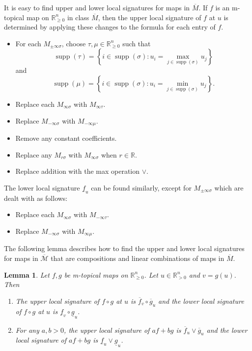 \documentclass[10pt,reqno]{amsart}
\newcommand{\R}{\mathbb{R}}
\newcommand{\supp}{\operatorname{supp}}
\theoremstyle{plain}
\newtheorem{lemma}[theorem]{Lemma}
\theoremstyle{definition}
\numberwithin{equation}{section}
\begin{document}
It is easy to find upper and lower local signatures for maps in $\overline{M}$. If $f$ is an m-topical map on $\R^n_{\ge 0}$ in class $\overline{M}$, then the upper local signature of $f$ at $u$ is determined by applying these changes to the formula for each entry of $f$. 
\begin{itemize}
\item For each $M_{\pm \infty \sigma}$, choose $\tau, \mu \in \R^n_{\ge 0}$ such that 
$$\supp(\tau) = \left\{i \in \supp(\sigma) : u_i = \max_{j \in \supp(\sigma)} u_j \right\}$$
and
$$\supp(\mu) = \left\{i \in \supp(\sigma) : u_i = \min_{j \in \supp(\sigma)} u_j \right\}.$$
\item Replace each $M_{\infty \sigma}$ with $M_{\infty \tau}$.
\item Replace $M_{-\infty \sigma}$ with $M_{-\infty \mu}$. %
\item Remove any constant coefficients.  
\item Replace any $M_{r\sigma}$ with $M_{\infty \sigma}$ when $r \in \R$.  
\item Replace addition with the max operation $\vee$.  
\end{itemize}
The lower local signature $\underline{f}_u$ can be found similarly, except for $M_{\pm \infty \sigma}$ which are dealt with as follows:
\begin{itemize}
\item Replace each $M_{\infty \sigma}$ with $M_{-\infty \tau}$.  
\item Replace $M_{-\infty \sigma}$ with $M_{\infty \mu}$.
\end{itemize}

The following lemma describes how to find the upper and lower local signatures for maps in $\overline{\mathcal{M}}$ that are compositions and linear combinations of maps in $\overline{M}$.  

\begin{lemma}
Let $f, g$ be m-topical maps on $\R^n_{\ge 0}$.  Let $u \in \R^n_{>0}$ and $v = g(u)$.  Then 
\begin{enumerate}
\item The upper local signature of $f \circ g$ at $u$ is $\overline{f}_v \circ \overline{g}_u$ and the lower local signature of $f \circ g$ at $u$ is $\underline{f}_v \circ \underline{g}_u$.  
\item For any $a, b > 0$, the upper local signature of $af + bg$ is $\overline{f}_u \vee \overline{g}_u$ and the lower local signature of $af + bg$ is $\underline{f}_u \vee \underline{g}_u$. 
\end{enumerate}
\end{lemma}
\end{document}
